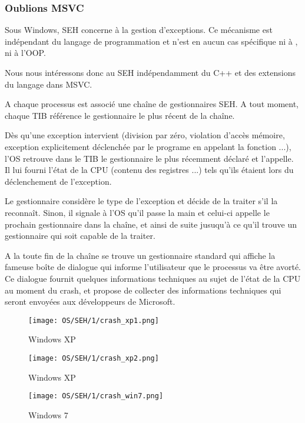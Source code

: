 ﻿\subsubsection{Oublions MSVC}

Sous Windows, \ac{SEH} concerne à la gestion d'exceptions. Ce mécanisme est indépendant du langage 
de programmation et n'est en aucun cas spécifique ni à \Cpp, ni à l'\ac{OOP}.

Nous nous intéressons donc au \ac{SEH} indépendamment du C++ et des extensions du langage dans MSVC.


A chaque processus est associé une chaîne de gestionnaires \ac{SEH}. A tout moment, chaque \ac{TIB} 
référence le gestionnaire le plus récent de la chaîne.

Dès qu'une exception intervient (division par zéro, violation d'accès mémoire, exception explicitement 
déclenchée par le programe en appelant la fonction  ...), l'OS retrouve dans le 
\ac{TIB} le gestionnaire le plus récemment déclaré et l'appelle. Il lui fourni l'état de la \ac{CPU} 
(contenu des registres ...) tels qu'ils étaient lors du déclenchement de l'exception.

Le gestionnaire considère le type de l'exception et décide de la traiter s'il la reconnaît. Sinon, il 
signale à l'\ac{OS} qu'il passe la main et celui-ci appelle le prochain gestionnaire dans la chaîne, 
et ainsi de suite jusuqu'à ce qu'il trouve un gestionnaire qui soit capable de la traiter.

A la toute fin de la chaîne se trouve un gestionnaire standard qui affiche la fameuse boîte de 
dialogue qui informe l'utilisateur que le processus va être avorté. Ce dialogue fournit quelques
informations techniques au sujet de l'état de la \ac{CPU} au moment du crash, et propose de collecter 
des informations techniques qui seront envoyées aux développeurs de Microsoft. 

\begin{figure}[H]
\centering
\texttt{[image: OS/SEH/1/crash\_xp1.png]}
\caption{Windows XP}
\end{figure}

\begin{figure}[H]
\centering
\texttt{[image: OS/SEH/1/crash\_xp2.png]}
\caption{Windows XP}
\end{figure}

\begin{figure}[H]
\centering
\texttt{[image: OS/SEH/1/crash\_win7.png]}
\caption{Windows 7}
\end{figure}

